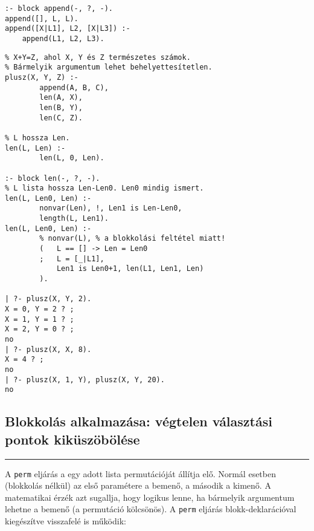 \begin{verbatim}
:- block append(-, ?, -).
append([], L, L).
append([X|L1], L2, [X|L3]) :-
    append(L1, L2, L3).
\end{verbatim}

\label{plusz3}
\begin{verbatim}
% X+Y=Z, ahol X, Y és Z természetes számok.
% Bármelyik argumentum lehet behelyettesítetlen.
plusz(X, Y, Z) :-
        append(A, B, C),
        len(A, X),
        len(B, Y),
        len(C, Z).

% L hossza Len.
len(L, Len) :-
        len(L, 0, Len).

:- block len(-, ?, -).
% L lista hossza Len-Len0. Len0 mindig ismert.
len(L, Len0, Len) :-
        nonvar(Len), !, Len1 is Len-Len0, 
        length(L, Len1).
len(L, Len0, Len) :- 
        % nonvar(L), % a blokkolási feltétel miatt!
        (   L == [] -> Len = Len0
        ;   L = [_|L1],
            Len1 is Len0+1, len(L1, Len1, Len)
        ).

| ?- plusz(X, Y, 2).
X = 0, Y = 2 ? ;
X = 1, Y = 1 ? ;
X = 2, Y = 0 ? ;
no
| ?- plusz(X, X, 8).
X = 4 ? ;
no
| ?- plusz(X, 1, Y), plusz(X, Y, 20).
no
\end{verbatim}

\subsection{Blokkolás alkalmazása: végtelen választási pontok kiküszöbölése}
\br

\hspace*{3mm}\rule[-5ex]{0.3mm}{11ex}\hspace*{-3mm}

\br

A {\tt perm} eljárás a egy adott lista permutációját állítja
elő. Normál esetben (blokkolás nélkül) az első paramétere a
bemenő, a második a kimenő. A matematikai érzék azt sugallja,
hogy logikus lenne, ha bármelyik argumentum lehetne a bemenő (a
permutáció kölcsönös). A {\tt perm} eljárás
blokk-deklarációval kiegészítve visszafelé is működik:

